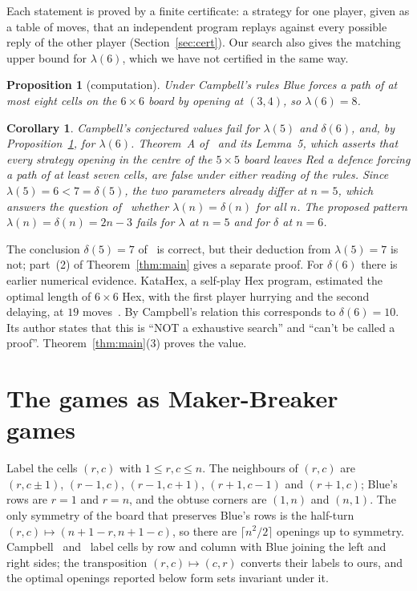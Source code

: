 \documentclass[11pt]{amsart}
\newtheorem{proposition}[theorem]{Proposition}
\newtheorem{corollary}[theorem]{Corollary}
\theoremstyle{definition}
\theoremstyle{remark}
\begin{document}
Each statement is proved by a finite certificate: a strategy for one player, given as a table of moves, that an independent program replays against every possible reply of the other player (Section~\ref{sec:cert}). Our search also gives the matching upper bound for $\lambda(6)$, which we have not certified in the same way.

\begin{proposition}[computation]\label{prop:lambda6}
Under Campbell's rules Blue forces a path of at most eight cells on the $6\times6$ board by opening at $(3,4)$, so $\lambda(6)=8$.
\end{proposition}

\begin{corollary}\label{cor:consequences}
Campbell's conjectured values fail for $\lambda(5)$ and $\delta(6)$, and, by Proposition~\ref{prop:lambda6}, for $\lambda(6)$. Theorem~A of~\cite{CPS2026} and its Lemma~5, which asserts that every strategy opening in the centre of the $5\times5$ board leaves Red a defence forcing a path of at least seven cells, are false under either reading of the rules. Since $\lambda(5)=6<7=\delta(5)$, the two parameters already differ at $n=5$, which answers the question of~\cite{CPS2026} whether $\lambda(n)=\delta(n)$ for all $n$. The proposed pattern $\lambda(n)=\delta(n)=2n-3$ fails for $\lambda$ at $n=5$ and for $\delta$ at $n=6$.
\end{corollary}

The conclusion $\delta(5)=7$ of~\cite{CPS2026} is correct, but their deduction from $\lambda(5)=7$ is not; part~(2) of Theorem~\ref{thm:main} gives a separate proof. For $\delta(6)$ there is earlier numerical evidence. KataHex, a self-play Hex program, estimated the optimal length of $6\times6$ Hex, with the first player hurrying and the second delaying, at $19$ moves~\cite{HZY2024,Irving2018}. By Campbell's relation this corresponds to $\delta(6)=10$. Its author states that this is ``NOT a exhaustive search'' and ``can't be called a proof''. Theorem~\ref{thm:main}(3) proves the value.

\section{The games as Maker-Breaker games}\label{sec:mb}

Label the cells $(r,c)$ with $1\le r,c\le n$. The neighbours of $(r,c)$ are $(r,c\pm1)$, $(r-1,c)$, $(r-1,c+1)$, $(r+1,c-1)$ and $(r+1,c)$; Blue's rows are $r=1$ and $r=n$, and the obtuse corners are $(1,n)$ and $(n,1)$. The only symmetry of the board that preserves Blue's rows is the half-turn $(r,c)\mapsto(n+1-r,n+1-c)$, so there are $\lceil n^2/2\rceil$ openings up to symmetry. Campbell~\cite{Campbell2004} and~\cite{CPS2026} label cells by row and column with Blue joining the left and right sides; the transposition $(r,c)\mapsto(c,r)$ converts their labels to ours, and the optimal openings reported below form sets invariant under it.
\end{document}
